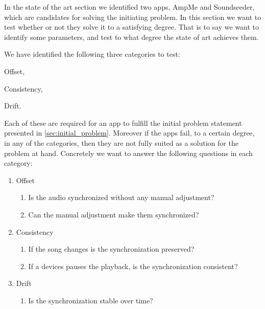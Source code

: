 In the state of the art section we identified two apps, AmpMe and Soundseeder, which are candidates for solving the initiating problem. 
In this section we want to test whether or not they solve it to a satisfying degree. 
That is to say we want to identify some parameters, and test to what degree the state of art achieves them.

We have identified the following three categories to test:
\begin{enumerate*}[label=(\alph*)]
    \item Offset,
    \item Consistency,
    \item Drift.
\end{enumerate*}

Each of these are required for an app to fulfill the initial problem statement presented in \vref{sec:initial_problem}.
Moreover if the apps fail, to a certain degree, in any of the categories, then they are not fully suited as a solution for the problem at hand. 
Concretely we want to answer the following questions in each category:
\begin{enumerate}[label=(\alph*)]
    \item Offset
    \begin{enumerate}[label=(\arabic*)]
        \item Is the audio synchronized without any manual adjustment?
        \item Can the manual adjustment make them synchronized?
    \end{enumerate} 
    \item Consistency
    \begin{enumerate}[start=3,label=(\arabic*)]
        \item If the song changes is the synchronization preserved?
        \item If a devices pauses the playback, is the synchronization consistent?
    \end{enumerate}
    \item Drift
    \begin{enumerate}[start=6,label=(\arabic*)]
        \item Is the synchronization stable over time?
    \end{enumerate}
\end{enumerate}
